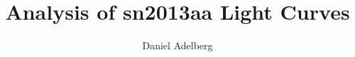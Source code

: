 \documentclass[iop]{emulateapj}
\begin{document}
\title{Analysis of sn2013aa Light Curves}
\author{Daniel Adelberg}
\end{document}
